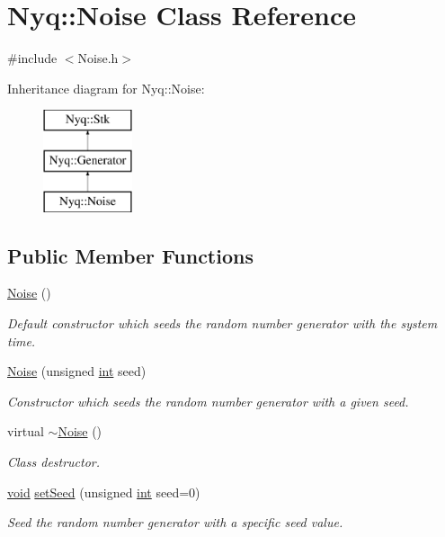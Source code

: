 \hypertarget{class_nyq_1_1_noise}{}\section{Nyq\+:\+:Noise Class Reference}
\label{class_nyq_1_1_noise}


{\ttfamily \#include $<$Noise.\+h$>$}

Inheritance diagram for Nyq\+:\+:Noise\+:\begin{figure}[H]
\begin{center}
\leavevmode
\includegraphics[height=3.000000cm]{class_nyq_1_1_noise}
\end{center}
\end{figure}
\subsection*{Public Member Functions}
\begin{DoxyCompactItemize}
\item 
\hyperlink{class_nyq_1_1_noise_a875a47574d1c86c793296b542e7de9f3}{Noise} ()
\begin{DoxyCompactList}\small\item\em Default constructor which seeds the random number generator with the system time. \end{DoxyCompactList}\item 
\hyperlink{class_nyq_1_1_noise_a8234d814872ae0bdd4d4d3633d33a1f3}{Noise} (unsigned \hyperlink{xmltok_8h_a5a0d4a5641ce434f1d23533f2b2e6653}{int} seed)
\begin{DoxyCompactList}\small\item\em Constructor which seeds the random number generator with a given seed. \end{DoxyCompactList}\item 
virtual \hyperlink{class_nyq_1_1_noise_a751f1c229c801b0abd4a84f8bf08d810}{$\sim$\+Noise} ()
\begin{DoxyCompactList}\small\item\em Class destructor. \end{DoxyCompactList}\item 
\hyperlink{sound_8c_ae35f5844602719cf66324f4de2a658b3}{void} \hyperlink{class_nyq_1_1_noise_a043bc8909ec44c384828a69f2574234e}{set\+Seed} (unsigned \hyperlink{xmltok_8h_a5a0d4a5641ce434f1d23533f2b2e6653}{int} seed=0)
\begin{DoxyCompactList}\small\item\em Seed the random number generator with a specific seed value. \end{DoxyCompactList}\end{DoxyCompactItemize}
